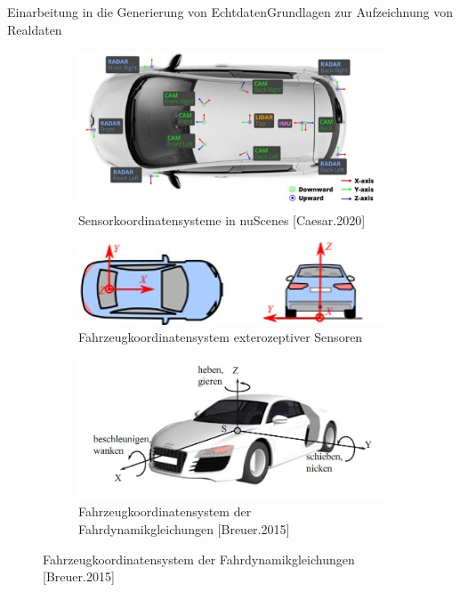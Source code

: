 \documentclass[169, handout	]{THIbeamer} %
\begin{document}
		\begin{frame}{Einarbeitung in die Generierung von Echtdaten}{Grundlagen zur Aufzeichnung von Realdaten}
		\begin{figure}
			\centering
			\begin{subfigure}[b]{0.4\textwidth}
				\includegraphics[scale=0.4]{required/Sensorkoordinatensysteme.jpg}
				\caption{Sensorkoordinatensysteme in nuScenes [Caesar.2020]}
				\label{ROS}
			\end{subfigure}
			\vfill
			\begin{subfigure}[b]{0.4\textwidth}
				\includegraphics[scale=0.5]{required/Fahrzeugkoordinatensystem exterozeptiver Sensoren.jpg}
				\caption{Fahrzeugkoordinatensystem exterozeptiver Sensoren}
				\label{ROS}
			\end{subfigure}
			\hspace{1.5 cm}
			\begin{subfigure}[b]{0.4\textwidth}
				\includegraphics[scale=0.2]{required/Fahrzeugkoordinatensystem CoG.jpg}
				\caption{Fahrzeugkoordinatensystem der Fahrdynamikgleichungen [Breuer.2015]}
				\label{ROS}
			\end{subfigure}
		\end{figure}
		
	\end{frame}
\end{document}
